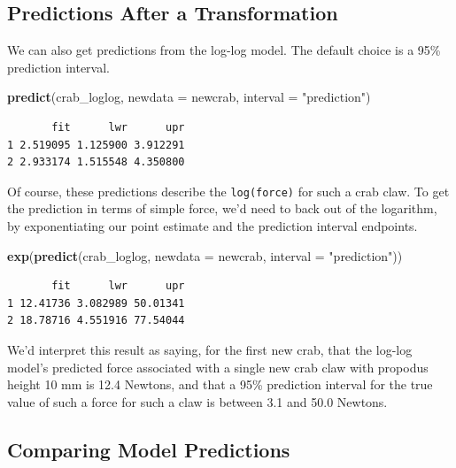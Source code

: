\documentclass[
]{book}
\newenvironment{Shaded}{\begin{snugshade}}{\end{snugshade}}
\newcommand{\DataTypeTok}[1]{\textcolor[rgb]{0.13,0.29,0.53}{#1}}
\newcommand{\KeywordTok}[1]{\textcolor[rgb]{0.13,0.29,0.53}{\textbf{#1}}}
\newcommand{\NormalTok}[1]{#1}
\newcommand{\StringTok}[1]{\textcolor[rgb]{0.31,0.60,0.02}{#1}}
\begin{document}
\hypertarget{predictions-after-a-transformation}{%
\subsection{Predictions After a Transformation}\label{predictions-after-a-transformation}}

We can also get predictions from the log-log model. The default choice is a 95\% prediction interval.

\begin{Shaded}
\begin{Highlighting}[]
\KeywordTok{predict}\NormalTok{(crab_loglog, }\DataTypeTok{newdata =}\NormalTok{ newcrab, }\DataTypeTok{interval =} \StringTok{"prediction"}\NormalTok{)}
\end{Highlighting}
\end{Shaded}

\begin{verbatim}
       fit      lwr      upr
1 2.519095 1.125900 3.912291
2 2.933174 1.515548 4.350800
\end{verbatim}

Of course, these predictions describe the \texttt{log(force)} for such a crab claw. To get the prediction in terms of simple force, we'd need to back out of the logarithm, by exponentiating our point estimate and the prediction interval endpoints.

\begin{Shaded}
\begin{Highlighting}[]
\KeywordTok{exp}\NormalTok{(}\KeywordTok{predict}\NormalTok{(crab_loglog, }\DataTypeTok{newdata =}\NormalTok{ newcrab, }\DataTypeTok{interval =} \StringTok{"prediction"}\NormalTok{))}
\end{Highlighting}
\end{Shaded}

\begin{verbatim}
       fit      lwr      upr
1 12.41736 3.082989 50.01341
2 18.78716 4.551916 77.54044
\end{verbatim}

We'd interpret this result as saying, for the first new crab, that the log-log model's predicted force associated with a single new crab claw with propodus height 10 mm is 12.4 Newtons, and that a 95\% prediction interval for the true value of such a force for such a claw is between 3.1 and 50.0 Newtons.

\hypertarget{comparing-model-predictions}{%
\subsection{Comparing Model Predictions}\label{comparing-model-predictions}}
\end{document}
